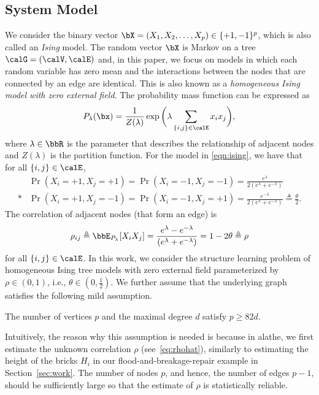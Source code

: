 \documentclass[11pt,onecolumn]{article}
\begin{document}
\subsection{System Model}
We consider the binary vector $\bX=(X_{1},X_2,\ldots, X_p)\in\{+1,-1\}^p$, which is also called an \emph{Ising} model. The random vector $\bX$ is Markov on a tree $\calG=(\calV,\calE)$ and, in this paper, we focus on models in which each random variable has zero mean and the interactions between the nodes that are connected by an edge are   identical. This is also known as a {\em homogeneous Ising model   with zero external field}\cite{daskalakis2019testing,tandon2021sga}. The probability mass function can be expressed as
\begin{align}
	P_\lambda(\bx)=\frac{1}{Z(\lambda)}\exp\bigg(\lambda\sum_{ \{i,j\}\in\calE} x_{i}x_{j}\bigg), \label{eqn:ising}
\end{align}
where $\lambda\in\bbR$ is the parameter that describes the relationship  of adjacent nodes and $Z(\lambda)$ is the partition function. For the model in \eqref{eqn:ising}, we have that for all $\{i,j\}\in\calE$, 
\begin{align}
	&\Pr(X_{i}=+1,X_{j}=+1)=\Pr(X_{i}=-1,X_{j}=-1)=\frac{e^{\lambda}}{2(e^{\lambda}+e^{-\lambda})}\nonumber\\*
	&\Pr(X_{i}=+1,X_{j}=-1)=\Pr(X_{i}=-1,X_{j}=+1)=\frac{e^{-\lambda}}{2(e^{\lambda}+e^{-\lambda})}\triangleq\frac{\theta}{2}.
\end{align}
The correlation of adjacent nodes  (that form an edge)
is
\begin{equation}
\rho_{ij}\triangleq\bbE_{P_\lambda}[X_{i}X_{j}]=\frac{e^{\lambda}-e^{-\lambda}}{(e^{\lambda}+e^{-\lambda})}=1-2\theta\triangleq\rho    
\end{equation}
 for all $\{i,j\}\in\calE$. In this work, we consider the structure learning problem of homogeneous Ising tree models with zero external field parameterized by $\rho\in(0,1)$, i.e., $\theta\in(0,\frac{1}{2})$. We further assume that the underlying graph satisfies the 
following mild assumption.
\begin{assumption}\label{assump:smalldeg}
	The number of vertices $p$ and the maximal degree $d$ satisfy $p\geq 82d$.
\end{assumption}
Intuitively, the reason why this assumption is needed is because in \ac{alathe}, we first estimate the unknown correlation $\rho$ (see~\eqref{eq:rhohat}), similarly to estimating the height of the bricks  $H_i$ in  our  flood-and-breakage-repair example in Section~\ref{sec:work}. The number of nodes $p$, and hence, the number of edges $p-1$, should be sufficiently large so that the estimate of $\rho$  is statistically reliable.
\end{document}
